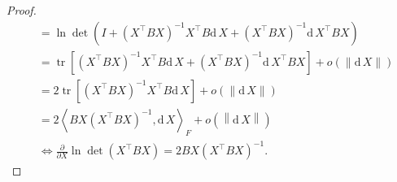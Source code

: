 \begin{proof}
\[\begin{aligned}
            &= \ln \det\left(I + \left(X^\top BX\right)^{-1} X^\top B \mathrm{d}\,X + \left(X^\top BX\right)^{-1} \mathrm{d}\,X^\top B X\right) \\
            &= \operatorname{tr}\left[\left(X^\top BX\right)^{-1} X^\top B \mathrm{d}\,X + \left(X^\top BX\right)^{-1} \mathrm{d}\,X^\top B X\right] + o\left(\|\mathrm{d}\,X\|\right) \\
            &= 2\operatorname{tr}\left[\left(X^\top BX\right)^{-1} X^\top B \mathrm{d}\,X\right] + o\left(\|\mathrm{d}\,X\|\right) \\
            &= 2\left\langle BX\left(X^\top BX\right)^{-1}, \mathrm{d}\,X \right\rangle_F + o\left(\left\|\mathrm{d}\,X\right\|\right) \\
            &\iff \frac{\partial}{\partial X} \ln \det\left(X^\top BX\right) = 2BX\left(X^\top BX\right)^{-1}.
        \end{aligned}
    \]
\end{proof}
